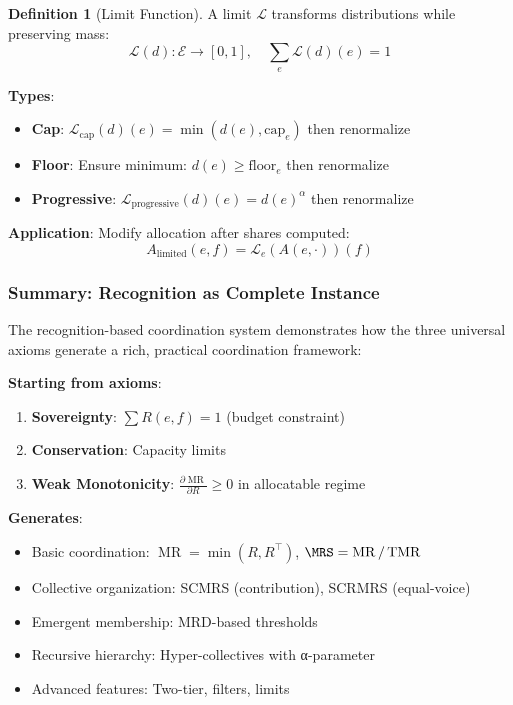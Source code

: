 \documentclass[11pt,a4paper]{article}
\theoremstyle{definition}
\newtheorem{definition}[theorem]{Definition}
\theoremstyle{remark}
\newcommand{\E}{\mathcal{E}}
\DeclareMathOperator{\MR}{MR}
\DeclareMathOperator{\TMR}{TMR}
\begin{document}
\begin{definition}[Limit Function]
A limit $\mathcal{L}$ transforms distributions while preserving mass:
\[ \mathcal{L}(d): \E \to [0,1], \quad \sum_e \mathcal{L}(d)(e) = 1 \]

\textbf{Types}:
\begin{itemize}
\item \textbf{Cap}: $\mathcal{L}_{\text{cap}}(d)(e) = \min(d(e), \text{cap}_e)$ then renormalize
\item \textbf{Floor}: Ensure minimum: $d(e) \ge \text{floor}_e$ then renormalize
\item \textbf{Progressive}: $\mathcal{L}_{\text{progressive}}(d)(e) = d(e)^\alpha$ then renormalize
\end{itemize}

\textbf{Application}: Modify allocation after shares computed:
\[ A_{\text{limited}}(e,f) = \mathcal{L}_e(A(e,\cdot))(f) \]
\end{definition}

\subsubsection{Summary: Recognition as Complete Instance}

The recognition-based coordination system demonstrates how the three universal axioms generate a rich, practical coordination framework:

\textbf{Starting from axioms}:
\begin{enumerate}
\item \textbf{Sovereignty}: $\sum R(e,f) = 1$ (budget constraint)
\item \textbf{Conservation}: Capacity limits
\item \textbf{Weak Monotonicity}: $\frac{\partial \MR}{\partial R} \ge 0$ in allocatable regime
\end{enumerate}

\textbf{Generates}:
\begin{itemize}
\item Basic coordination: $\MR = \min(R, R^\top)$, $\MRS = \MR/\TMR$
\item Collective organization: SCMRS (contribution), SCRMRS (equal-voice)
\item Emergent membership: MRD-based thresholds
\item Recursive hierarchy: Hyper-collectives with α-parameter
\item Advanced features: Two-tier, filters, limits
\end{itemize}
\end{document}

